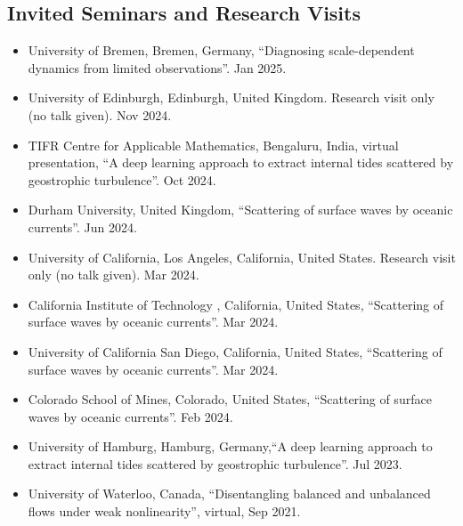 \documentclass[a4paper,12pt]{article}
\begin{document}
\subsection{Invited Seminars and Research Visits }
\begin{itemize}[leftmargin=*,noitemsep]
\item University of Bremen, Bremen, Germany, ``Diagnosing scale-dependent dynamics from limited observations”. Jan 2025.
\item University of Edinburgh, Edinburgh, United Kingdom. Research visit only (no talk given). Nov 2024.
\item TIFR Centre for Applicable Mathematics, Bengaluru, India, virtual presentation, ``A deep learning approach to extract internal tides scattered by geostrophic turbulence”. Oct 2024.
\item Durham University, United Kingdom, ``Scattering of surface waves by oceanic currents”. Jun 2024.
\item University of California, Los Angeles, California, United States. Research visit only (no talk given). Mar 2024.
\item California Institute of Technology , California, United States, ``Scattering of surface waves by oceanic currents”. Mar 2024.
\item University of California San Diego, California, United States, ``Scattering of surface waves by oceanic currents”. Mar 2024.
\item Colorado School of Mines, Colorado, United States, ``Scattering of surface waves by oceanic currents”. Feb 2024.
\item University of Hamburg, Hamburg, Germany,``A deep learning approach to extract internal tides scattered by geostrophic turbulence”. Jul 2023.
\item University of Waterloo, Canada, ``Disentangling balanced and unbalanced flows under weak nonlinearity”, virtual,  Sep 2021.
\end{itemize}
\end{document}
